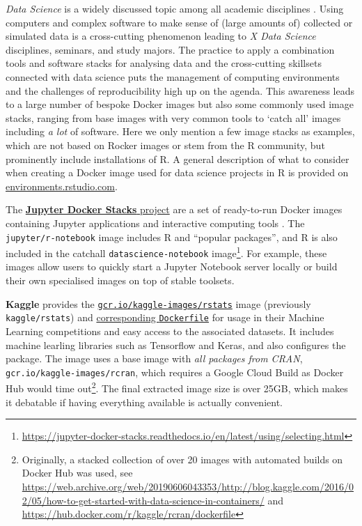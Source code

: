 \label{datascience}

\emph{Data Science} is a widely discussed topic among all academic
disciplines \citep[cf. e.g.,][]{donoho_50_2017}. Using computers and
complex software to make sense of (large amounts of) collected or
simulated data is a cross-cutting phenomenon leading to \emph{X Data
Science} disciplines, seminars, and study majors. The practice to apply
a combination tools and software stacks for analysing data and the
cross-cutting skillsets connected with data science puts the management
of computing environments and the challenges of reproducibility high up
on the agenda. This awareness leads to a large number of bespoke Docker
images but also some commonly used image stacks, ranging from base
images with very common tools to `catch all' images including \emph{a
lot} of software. Here we only mention a few image stacks as examples,
which are not based on Rocker images or stem from the R community, but
prominently include installations of R. A general description of what to
consider when creating a Docker image used for data science projects in
R is provided on
\href{https://environments.rstudio.com/docker}{environments.rstudio.com}.

The \href{https://github.com/jupyter/docker-stacks/}{\textbf{Jupyter
Docker Stacks} project} are a set of ready-to-run Docker images
containing Jupyter applications and interactive computing tools
\citep{project_jupyter_jupyter_2018}. The \texttt{jupyter/r-notebook}
image includes R and ``popular packages'', and R is also included in the
catchall \texttt{datascience-notebook}
image\footnote{\href{https://jupyter-docker-stacks.readthedocs.io/en/latest/using/selecting.html}{https://jupyter-docker-stacks.readthedocs.io/en/latest/using/selecting.html}}.
For example, these images allow users to quickly start a Jupyter
Notebook server locally or build their own specialised images on top of
stable toolsets.

\textbf{Kaggle} provides the
\href{https://hub.docker.com/r/kaggle/rstats}{\texttt{gcr.io/kaggle-images/rstats}}
image (previously \texttt{kaggle/rstats}) and
\href{https://github.com/Kaggle/docker-rstats}{corresponding
\texttt{Dockerfile}} for usage in their Machine Learning competitions
and easy access to the associated datasets. It includes machine learling
libraries such as Tensorflow and Keras, and also configures the
 package. The image uses a base image with \emph{all
packages from CRAN}, \texttt{gcr.io/kaggle-images/rcran}, which requires
a Google Cloud Build as Docker Hub would time
out\footnote{Originally, a stacked collection of over 20 images with automated builds on Docker Hub was used, see \href{https://web.archive.org/web/20190606043353/http://blog.kaggle.com/2016/02/05/how-to-get-started-with-data-science-in-containers/}{https://web.archive.org/web/20190606043353/http://blog.kaggle.com/2016/02/05/how-to-get-started-with-data-science-in-containers/} and \href{https://hub.docker.com/r/kaggle/rcran/dockerfile}{https://hub.docker.com/r/kaggle/rcran/dockerfile}}.
The final extracted image size is over 25GB, which makes it debatable if
having everything available is actually convenient.

